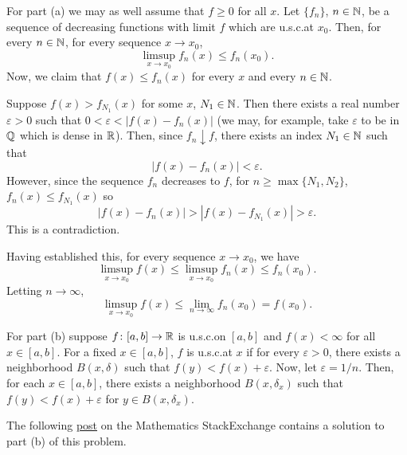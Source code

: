 \begin{solution}
  For part (a) we may as well assume that $f\geq 0$ for all $x$. Let
  $\{f_n\}$, $n\in\mathbb{N}$, be a sequence of decreasing functions with limit
  $f$ which are u.s.c.\@ at $x_0$. Then, for every $n\in\mathbb{N}$, for every
  sequence $x\to x_0$,
  \[
    \limsup_{x\to x_0}f_n(x)\leq f_n(x_0).
  \]
  Now, we claim that $f(x)\leq f_n(x)$ for every $x$ and every $n\in\mathbb{N}$.
  \begin{subproof}
    Suppose $f(x)>f_{N_1}(x)$ for some $x$, $N_1\in\mathbb{N}$. Then there exists
    a real number $\varepsilon>0$ such that $0<\varepsilon<|f(x)-f_n(x)|$
    (we may, for example, take $\varepsilon$ to be in $\mathbb{Q}$ which is dense
    in $\mathbb{R}$). Then, since $f_n\downarrow f$, there exists an index
    $N_1\in\mathbb{N}$ such that
    \[
      |f(x)-f_n(x)|<\varepsilon.
    \]
    However, since the sequence $f_n$ decreases to $f$, for
    $n\geq\max\{N_1,N_2\}$, $f_n(x)\leq f_{N_1}(x)$ so
    \[
      |f(x)-f_n(x)|>|f(x)-f_{N_1}(x)|>\varepsilon.
    \]
    This is a contradiction.
  \end{subproof}
  Having established this, for every sequence $x\to x_0$, we have
  \[
    \limsup_{x\to x_0} f(x)\leq \limsup_{x\to x_0} f_n(x)\leq f_n(x_0).
  \]
  Letting $n\to\infty$,
  \[
    \limsup_{x\to x_0} f(x)\leq \lim_{n\to\infty}f_n(x_0)=f(x_0).
  \]

  For part (b) suppose $f\colon [a,b]\to\mathbb{R}$ is u.s.c.\@ on $[a,b]$ and
  $f(x)<\infty$ for all $x\in [a,b]$. For a fixed $x\in[a,b]$, $f$ is
  u.s.c.\@ at $x$ if for every $\varepsilon>0$, there exists a neighborhood
  $B(x,\delta)$ such that $f(y)<f(x)+\varepsilon$. Now, let
  $\varepsilon=1/n$. Then, for each $x\in [a,b]$, there exists a
  neighborhood $B(x,\delta_x)$ such that $f(y)<f(x)+\varepsilon$ for
  $y\in B(x,\delta_x)$.

  The following
  \href{http://math.stackexchange.com/questions/462534/recognizing-uppersemicontinuous-function-as-a-pointwise-decreasing-limit}{post}
  on the Mathematics StackExchange contains a solution to part (b) of this
  problem.


\end{solution}
